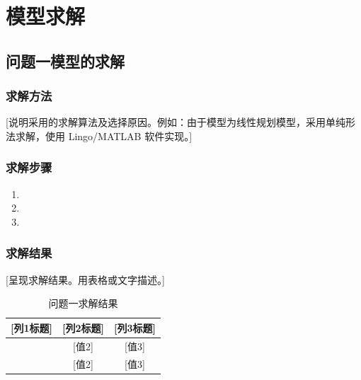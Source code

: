
\section{模型求解}

\subsection{问题一模型的求解}

\subsubsection{求解方法}

[说明采用的求解算法及选择原因。例如：由于模型为线性规划模型，采用单纯形法求解，使用 Lingo/MATLAB 软件实现。]

\subsubsection{求解步骤}

\begin{enumerate}
    \item [步骤1描述]
    \item [步骤2描述]
    \item [步骤3描述]
\end{enumerate}

\subsubsection{求解结果}

[呈现求解结果。用表格或文字描述。]

\begin{table}[htbp]
\centering
\caption{问题一求解结果}
\label{tab:result1}
\begin{tabular}{ccc}
\toprule
\textbf{[列1标题]} & \textbf{[列2标题]} & \textbf{[列3标题]} \\
\midrule
[值1] & [值2] & [值3] \\
[值1] & [值2] & [值3] \\
\bottomrule
\end{tabular}
\end{table}

